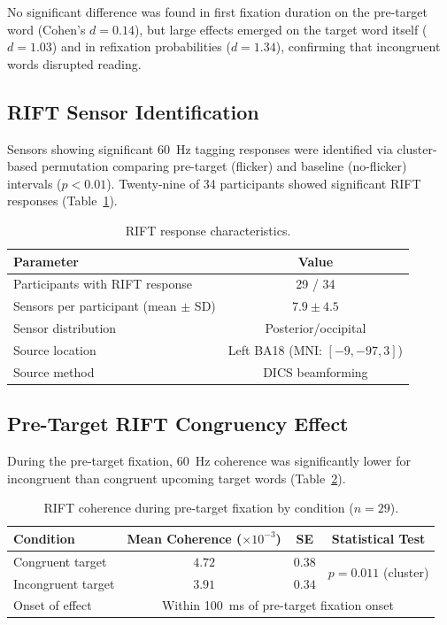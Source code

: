 \documentclass[11pt]{article}
\begin{document}
No significant difference was found in first fixation duration on the pre-target word (Cohen's $d = 0.14$), but large effects emerged on the target word itself ($d = 1.03$) and in refixation probabilities ($d = 1.34$), confirming that incongruent words disrupted reading.

\subsection{RIFT Sensor Identification}

Sensors showing significant 60~Hz tagging responses were identified via cluster-based permutation comparing pre-target (flicker) and baseline (no-flicker) intervals ($p < 0.01$). Twenty-nine of 34 participants showed significant RIFT responses (Table~\ref{tab:rift_sensors}).

\begin{table}[H]
\centering
\caption{RIFT response characteristics.}
\label{tab:rift_sensors}
\begin{tabular}{@{}lc@{}}
\toprule
Parameter & Value \\
\midrule
Participants with RIFT response & 29 / 34 \\
Sensors per participant (mean $\pm$ SD) & $7.9 \pm 4.5$ \\
Sensor distribution & Posterior/occipital \\
Source location & Left BA18 (MNI: $[-9, -97, 3]$) \\
Source method & DICS beamforming \\
\bottomrule
\end{tabular}
\end{table}

\subsection{Pre-Target RIFT Congruency Effect}

During the pre-target fixation, 60~Hz coherence was significantly lower for incongruent than congruent upcoming target words (Table~\ref{tab:congruency}).

\begin{table}[H]
\centering
\caption{RIFT coherence during pre-target fixation by condition ($n = 29$).}
\label{tab:congruency}
\begin{tabular}{@{}lccc@{}}
\toprule
Condition & Mean Coherence ($\times 10^{-3}$) & SE & Statistical Test \\
\midrule
Congruent target & $4.72$ & $0.38$ & \multirow{2}{*}{$p = 0.011$ (cluster)} \\
Incongruent target & $3.91$ & $0.34$ & \\
\midrule
Onset of effect & \multicolumn{3}{c}{Within 100~ms of pre-target fixation onset} \\
\bottomrule
\end{tabular}
\end{table}
\end{document}
